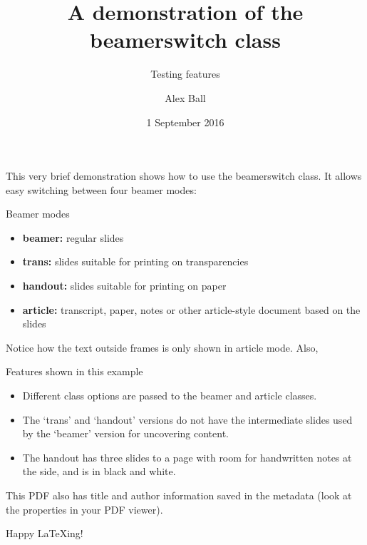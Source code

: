 \documentclass[also={trans,handout,article}]{beamerswitch}
\title{A demonstration of the \textsf{beamerswitch} class}
\subtitle{Testing features}
\author{Alex Ball}
\institute{University of Life}
\date{1 September 2016}
\begin{document}
  \begin{frame}
    \maketitle
  \end{frame}

  This very brief demonstration shows how to use the \textsf{beamerswitch} class.
  It allows easy switching between four \textsf{beamer} modes:

  \begin{frame}{Beamer modes}
    \begin{itemize}[<+->]
      \item \textbf{beamer:} regular slides
      \item \textbf{trans:} slides suitable for printing on transparencies
      \item \textbf{handout:} slides suitable for printing on paper
      \item \textbf{article:} transcript, paper, notes or other article-style
        document based on the slides
    \end{itemize}
  \end{frame}

  Notice how the text outside frames is only shown in article mode. Also,

  \begin{frame}{Features shown in this example}
    \begin{itemize}[<+->]
      \item Different class options are passed to the \textsf{beamer} and
        \textsf{article} classes.
      \item The `trans' and `handout' versions do not have the intermediate
        slides used by the `beamer' version for uncovering content.
      \item The handout has three slides to a page with room for handwritten
        notes at the side, and is in black and white.
    \end{itemize}

  \end{frame}

  This PDF also has title and author information saved in the metadata (look
  at the properties in your PDF viewer).

  Happy {\LaTeX}ing!
\end{document}
